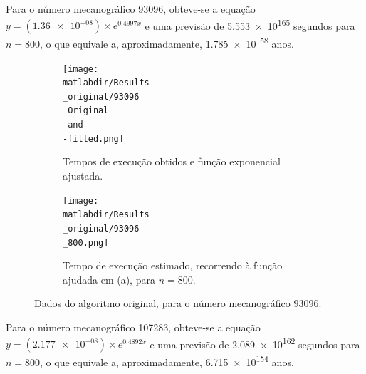 \documentclass[portuguese,11pt,a4paper,titlepage]{article}
\newcommand{\matlabdir}{"../MATLAB-fittings"}
\begin{document}
Para o número mecanográfico 93096, obteve-se a equação \begin{math}y = (\num{1.36e-08})\times e^{0.4997x}\end{math}
e uma previsão de \num{5.553e+165} segundos para \begin{math}n = 800\end{math}, o que equivale a, aproximadamente, \num{1.785e+158} anos.

\begin{figure}[h]
	\begin{subfigure}{0.47\textwidth}
	\texttt{[image: \\matlabdir/Results\\\_original/93096\\\_Original\\-and\\-fitted.png]} 
	\caption{Tempos de execução obtidos e função exponencial ajustada.}
	\label{fig:original_93096_plot}
	\end{subfigure}
	\hspace{0.049\textwidth}
	\begin{subfigure}{0.47\textwidth}
	\texttt{[image: \\matlabdir/Results\\\_original/93096\\\_800.png]}
	\caption{Tempo de execução estimado, recorrendo à função ajudada em (a), para \begin{math}n=800\end{math}.}
	\label{fig:original_93096_800}
	\end{subfigure}
	
	\caption{Dados do algoritmo original, para o número mecanográfico 93096.}
	\vspace{-20pt}
	\label{fig:original_93096}
\end{figure}

\pagebreak
Para o número mecanográfico 107283, obteve-se a equação \begin{math}y = (\num{2.177e-08})\times e^{0.4892x}\end{math}
e uma previsão de \num{2.089e+162} segundos para \begin{math}n = 800\end{math}, o que equivale a, aproximadamente, \num{6.715e+154} anos.
\end{document}
